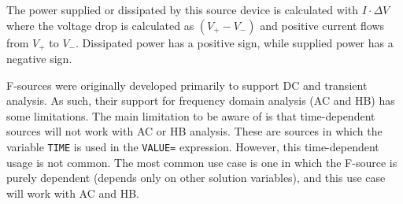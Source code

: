 \begin{Device}
The power supplied or dissipated by this source device is calculated 
with $I \cdot \Delta V$ where the voltage drop is calculated as $(V_+ - V_-)$ 
and positive current flows from $V_+$ to $V_-$.  Dissipated power has a
positive sign, while supplied power has a negative sign.

F-sources were originally developed primarily to support DC and transient analysis.  
As such, their support for frequency domain analysis (AC and HB) has some limitations.  
The main limitation to be aware of is that time-dependent sources will not work with AC or HB analysis.  
These are sources in which the variable \texttt{TIME} is used in the \texttt{VALUE=} expression. 
However, this time-dependent usage is not common.  The most 
common use case is one in which the F-source is purely dependent (depends only 
on other solution variables), and this use case will work with AC and HB.  

\end{Device}
